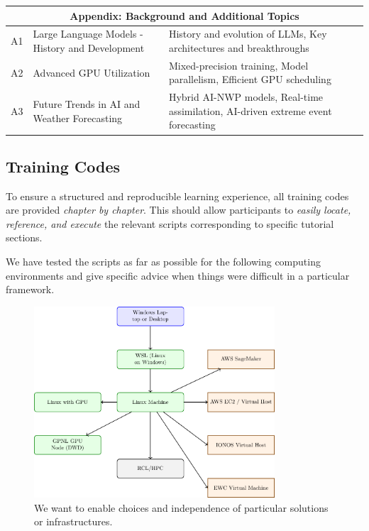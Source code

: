 \begin{longtable}{|c|p{5cm}|p{8cm}|}
\multicolumn{3}{|c|}{\cellcolor{appendixblue} \textbf{Appendix: Background and Additional Topics}} \\ \hline
\rowcolor{lightblue} A1 & Large Language Models - History and Development & History and evolution of LLMs, Key architectures and breakthroughs \\ \hline
A2 & Advanced GPU Utilization & Mixed-precision training, Model parallelism, Efficient GPU scheduling \\ \hline
\rowcolor{lightblue} A3 & Future Trends in AI and Weather Forecasting & Hybrid AI-NWP models, Real-time assimilation, AI-driven extreme event forecasting \\ \hline

\end{longtable}

%
\subsection{Training Codes}
\noindent To ensure a structured and reproducible learning experience, all training codes are provided \emph{chapter by chapter}. This should allow participants to \emph{easily locate, reference, and execute} the relevant scripts corresponding to specific tutorial sections. 

We have tested the scripts as far as possible for the following computing environments and give specific advice when things were difficult in a particular framework. 

\begin{center}
\begin{figure}[h]
   \centerline{\includegraphics[width=0.8\textwidth]{chapters/computing_environments.pdf}}
	\caption{We want to enable choices and independence of particular solutions or infrastructures.}
\end{figure}
\end{center}%

